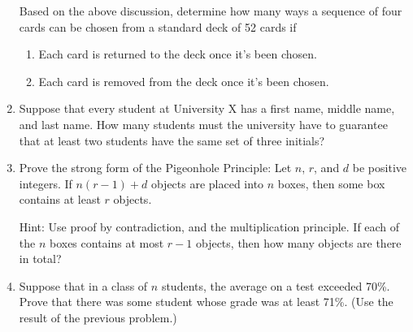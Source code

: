 \documentclass[letterpaper,12pt]{article}
\begin{document}
\begin{enumerate}
Based on the above discussion, determine how many ways a sequence of four cards can be chosen from a standard deck of 52 cards if
\begin{enumerate}
 \item Each card is returned to the deck once it's been chosen.
 \item Each card is removed from the deck once it's been chosen.
\end{enumerate}
\item Suppose that every student at University X has a first name, middle name, and last name. How many students must the university have to guarantee that at least two students have the same set of three initials?
\item Prove the strong form of the Pigeonhole Principle: Let $n$, $r$, and $d$ be positive integers.  If $n(r-1)+d$ objects are placed into $n$ boxes, then some box contains at least $r$ objects.

Hint: Use proof by contradiction, and the multiplication principle. If each of the $n$ boxes contains at most $r-1$ objects, then how many objects are there in total?
\item Suppose that in a class of $n$ students, the average on a test exceeded 70\%. Prove that there was some student whose grade was at least 71\%. (Use the result of the previous problem.)

\end{enumerate}
\end{document}
